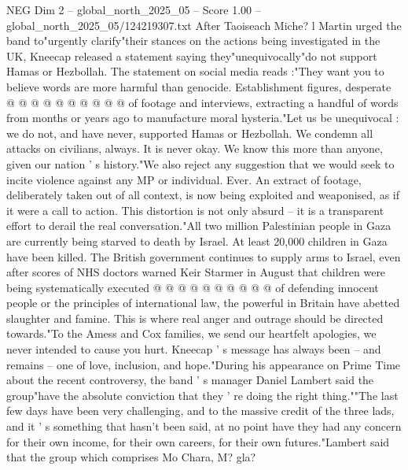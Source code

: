 \begin{textsample}{NEG Dim 2 – global\_north\_2025\_05 – Score 1.00 – global\_north\_2025\_05/124219307.txt}
After Taoiseach Miche? l Martin urged the band to"urgently clarify"their stances on the actions being investigated in the UK, Kneecap released a statement saying they"unequivocally"do not support Hamas or Hezbollah.
The statement on social media reads :"They want you to believe words are more harmful than genocide.
Establishment figures, desperate @ @ @ @ @ @ @ @ @ @ of footage and interviews, extracting a handful of words from months or years ago to manufacture moral hysteria."Let us be unequivocal : we do not, and have never, supported Hamas or Hezbollah.
We condemn all attacks on civilians, always.
It is never okay.
We know this more than anyone, given our nation ' s history."We also reject any suggestion that we would seek to incite violence against any MP or individual.
Ever.
An extract of footage, deliberately taken out of all context, is now being exploited and weaponised, as if it were a call to action.
This distortion is not only absurd -- it is a transparent effort to derail the real conversation."All two million Palestinian people in Gaza are currently being starved to death by Israel.
At least 20,000 children in Gaza have been killed.
The British government continues to supply arms to Israel, even after scores of NHS doctors warned Keir Starmer in August that children were being systematically executed @ @ @ @ @ @ @ @ @ @ of defending innocent people or the principles of international law, the powerful in Britain have abetted slaughter and famine.
This is where real anger and outrage should be directed towards."To the Amess and Cox families, we send our heartfelt apologies, we never intended to cause you hurt.
Kneecap ' s message has always been -- and remains -- one of love, inclusion, and hope."During his appearance on Prime Time about the recent controversy, the band ' s manager Daniel Lambert said the group"have the absolute conviction that they ' re doing the right thing.""The last few days have been very challenging, and to the massive credit of the three lads, and it ' s something that hasn't been said, at no point have they had any concern for their own income, for their own careers, for their own futures."Lambert said that the group which comprises Mo Chara, M? gla?

\end{textsample}
